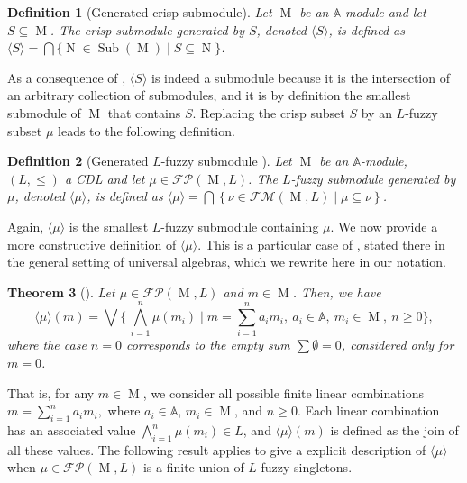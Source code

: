 \documentclass[a4paper,10pt]{article}
\newtheorem{theorem}{Theorem}[section]
\newtheorem{definition}[theorem]{Definition}
\newcommand{\bba}{\mathbb{A}}
\newcommand{\calfm}{\mathcal{F\!M}}
\newcommand{\calfp}{\mathcal{FP}}
\DeclareMathOperator{\sub}{Sub}
\DeclareMathOperator{\Mo}{M}
\DeclareMathOperator{\No}{N}
\begin{document}
\begin{definition}[Generated crisp submodule]
\label{def:generated}
Let \(\Mo\) be an \(\bba\)-module and let \(S \subseteq \Mo\).
The \emph{crisp submodule generated by \(S\)}, denoted \(\langle S \rangle\), is defined as \(\langle S \rangle = \bigcap \{\No \in \sub(\Mo) \mid S \subseteq \No\}\).
\end{definition}

As a consequence of , \(\langle S \rangle\) is indeed a submodule because it is the intersection of an arbitrary collection of submodules, and it is by definition the smallest submodule of \(\Mo\) that contains \(S\). Replacing the crisp subset \(S\) by an \(L\)-fuzzy subset \(\mu\) leads to the following definition.

\begin{definition} [Generated \(L\)-fuzzy submodule \cite{ashok2020fuzzy}]
\label{def:generatedsubmodule}
Let \(\Mo\) be an \(\bba\)-module, \((L,\leq)\) a CDL and let \(\mu \in \calfp(\Mo,L)\). The \emph{\(L\)-fuzzy submodule generated by \(\mu\)}, denoted \(\langle \mu \rangle\), is defined as \(\langle \mu \rangle = \bigcap \left\{ \nu \in \calfm(\Mo,L) \mid \mu \subseteq \nu \right\}\).
\end{definition}

Again, \(\langle \mu \rangle\) is the smallest \(L\)-fuzzy submodule containing \(\mu\). We now provide a more constructive definition of \(\langle \mu \rangle\). This is a particular case of \cite[Theorem~3.4]{addis2021commutator}, stated there in the general setting of universal algebras, which we rewrite here in our notation.

\begin{theorem}[\cite{addis2021commutator}]
\label{thm:generatedconstructive}
Let \( \mu \in \calfp(\Mo,L) \) and \(m \in \Mo\). Then, we have
\[
\langle \mu \rangle (m)
= \bigvee \Big\{\,\bigwedge_{i=1}^{n} \mu(m_i)\;\Big|\;
m = \sum_{i=1}^{n} a_i m_i,\ a_i \in \bba,\ m_i \in \Mo,\ n \ge 0 \Big\},
\]
where the case \(n = 0\) corresponds to the empty sum \(\sum \emptyset = 0\), considered only for \(m = 0\).
\end{theorem}

That is, for any \(m \in \Mo\), we consider all possible finite linear combinations \(m = \sum_{i=1}^{n} a_i m_i,\)
where \(a_i \in \bba\), \(m_i \in \Mo\), and \(n \geq 0\). Each linear combination has an associated value \(\bigwedge_{i=1}^{n} \mu(m_i) \in L\), and \(\langle \mu \rangle(m)\) is defined as the join of all these values.  
The following result applies  to give a explicit description of \(\langle \mu \rangle\) when \(\mu \in \calfp(\Mo,L)\) is a finite union of \(L\)-fuzzy singletons.
\end{document}
